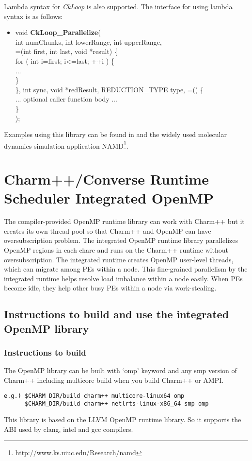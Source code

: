 Lambda syntax for \emph{CkLoop} is also supported. The interface for using lambda syntax is as follows:
\begin{itemize}
\item void \textbf{CkLoop\_Parallelize}( \\
int numChunks, int lowerRange, int upperRange, \\
    \lbrack=\rbrack(int first, int last, void *result) \{ \\
    for ( int i=first; i\textless=last; ++i ) \{ \\
      ... \\
    \} \\
  \}, int sync, void *redResult, REDUCTION\_TYPE type, \lbrack=\rbrack() \{ \\
    ... optional caller function body ... \\
  \} \\
);
\end{itemize}

Examples using this library can be found in  and the
widely used molecular dynamics simulation application
NAMD\footnote{http://www.ks.uiuc.edu/Research/namd}.

\section{Charm++/Converse Runtime Scheduler Integrated OpenMP}
The compiler-provided OpenMP runtime library can work with Charm++ but it creates its own thread pool so that Charm++ 
and OpenMP can have oversubscription problem. The integrated OpenMP runtime library parallelizes OpenMP regions in each chare 
and runs on the Charm++ runtime without oversubscription. The integrated runtime creates OpenMP user-level threads, which can migrate among PEs within 
a node. This fine-grained parallelism by the integrated runtime helps resolve load imbalance within a node easily. When PEs become idle, they help other busy PEs within a node via work-stealing.
\subsection{Instructions to build and use the integrated OpenMP library}
\subsubsection{Instructions to build}
The OpenMP library can be built with `omp' keyword and any smp version of Charm++ including multicore build when you build Charm++ or AMPI.\\
\begin{verbatim}
e.g.) $CHARM_DIR/build charm++ multicore-linux64 omp
      $CHARM_DIR/build charm++ netlrts-linux-x86_64 smp omp
\end{verbatim}
This library is based on the LLVM OpenMP runtime library. So it supports the ABI used by clang, intel and gcc compilers.

